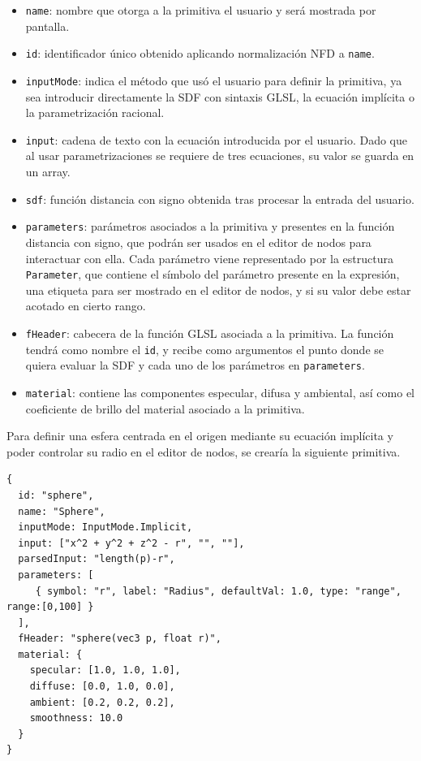 \begin{itemize}
    \item \texttt{name}: nombre que otorga a la primitiva el usuario y será mostrada por pantalla.
    \item \texttt{id}: identificador único obtenido aplicando normalización NFD a \texttt{name}.
    \item \texttt{inputMode}: indica el método que usó el usuario para definir la primitiva, ya sea introducir directamente la SDF con sintaxis GLSL, la ecuación implícita o la parametrización racional.
    \item \texttt{input}: cadena de texto con la ecuación introducida por el usuario. Dado que al usar parametrizaciones se requiere de tres ecuaciones, su valor se guarda en un array.
    \item \texttt{sdf}: función distancia con signo obtenida tras procesar la entrada del usuario.
    \item \texttt{parameters}: parámetros asociados a la primitiva y presentes en la función distancia con signo, que podrán ser usados en el editor de nodos para interactuar con ella. Cada parámetro viene representado por la estructura \texttt{Parameter}, que contiene el símbolo del parámetro presente en la expresión, una etiqueta para ser mostrado en el editor de nodos, y si su valor debe estar acotado en cierto rango. 
    \item \texttt{fHeader}: cabecera de la función GLSL asociada a la primitiva. La función tendrá como nombre el \texttt{id}, y recibe como argumentos el punto donde se quiera evaluar la SDF y cada uno de los parámetros en \texttt{parameters}.
    \item \texttt{material}: contiene las componentes especular, difusa y ambiental, así como el coeficiente de brillo del material asociado a la primitiva.
\end{itemize}
\begin{ejemplo}
Para definir una esfera centrada en el origen mediante su ecuación implícita y poder controlar su radio en el editor de nodos, se crearía la siguiente primitiva.
\begin{lstlisting}
{
  id: "sphere",
  name: "Sphere",
  inputMode: InputMode.Implicit,
  input: ["x^2 + y^2 + z^2 - r", "", ""],
  parsedInput: "length(p)-r",
  parameters: [
     { symbol: "r", label: "Radius", defaultVal: 1.0, type: "range", range:[0,100] }
  ],
  fHeader: "sphere(vec3 p, float r)",
  material: {
    specular: [1.0, 1.0, 1.0],
    diffuse: [0.0, 1.0, 0.0],
    ambient: [0.2, 0.2, 0.2],
    smoothness: 10.0
  }
}
\end{lstlisting}
\end{ejemplo}

